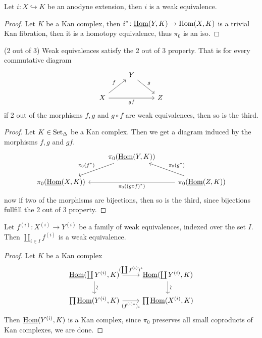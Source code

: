 \begin{prop}
    Let $i \colon X \hookrightarrow K$ be an anodyne extension, then $i$ is a weak equivalence.
\end{prop}

\begin{proof}
    Let $K$ be a Kan complex, then $i^* \colon \underline{\operatorname{Hom}}(Y,K) \to \operatorname{Hom}(X,K) $ is a trivial Kan fibration, then it is a homotopy equivalence, thus $\pi_0$ is an iso.
\end{proof}

\begin{prop}{(2 out of 3)}
\label{2 out of 3 weak equivalences}
    Weak equivalences satisfy the 2 out of 3 property. 
    That is for every commutative diagram
    \[
    \begin{tikzcd}
        &
        Y
        \ar[rd, "g"]
        &
        \\
        X
        \ar[ru, "f"]
        \ar[rr,"gf"']
        &&
        Z
    \end{tikzcd}
    \]
    if 2 out of the morphisms $f,g$ and $g\circ f$ are weak equivalences, then so is the third.
\end{prop}    

\begin{proof}
    Let $K \in \operatorname{Set}_{\Delta}$ be a Kan complex. 
    Then we get a diagram induced by the morphisms $f,g$ and $gf$.
    \[
    \begin{tikzcd}
        &
        \pi_0(\underline{\Hom}(Y,K))
        \ar[ld,"{\pi_0(f^*)}"']
        &
        \\
        \pi_0(\underline{\Hom}(X,K))
        &&
        \pi_0(\underline{\Hom}(Z,K))
        \ar[ll, "{\pi_0((g \circ f)^*)}"]
        \ar[lu, "{\pi_0(g^*)}"']
    \end{tikzcd}
    \]
    now if two of the morphisms are bijections, then so is the third, since bijections fullfill the 2 out of 3 property.
\end{proof}

\begin{prop}
    Let $f^{(i)}\colon X^{(i)} \to Y^{(i)}$ be a family of weak equivalences, indexed over the set $I$.
    Then $\coprod_{i \in I} f^{(i)}$ is a weak equivalence.
\end{prop}

\begin{proof}
    Let $K$ be a Kan complex 
    \[
    \begin{tikzcd}
        \underline{\Hom}(\coprod Y^{(i)},K)
        \ar[d,sloped, auto= false, "\sim"]
        \ar[r, "(\coprod f^{(i)})^*"]
        &
        \underline{\Hom}(\coprod Y^{(i)}, K)
        \ar[d,sloped, auto= false, "\sim"]
        \\
        \prod \underline{\Hom} ( Y^{(i)}, K) 
        \ar[r, "(f^{(i)*})_i"']
        &
        \prod \underline{\Hom}(X^{(i)},K)
    \end{tikzcd}
    \]
    Then $\underline{\operatorname{Hom}}(Y^{(i)},K)$ is a Kan complex, since $\pi_0$ preserves all small coproducts of Kan complexes, we are done.
\end{proof}

